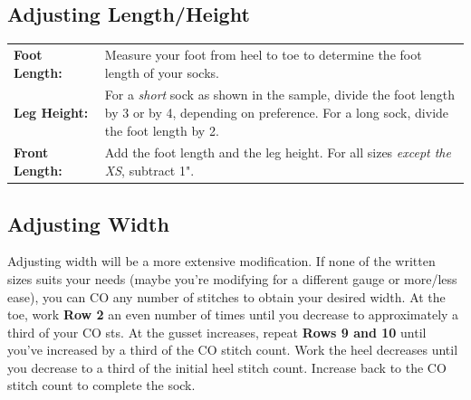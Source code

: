\documentclass[12pt]{article}
\newcommand{\blank}{\underline{\hspace{2em}} } %
\begin{document}
\subsection*{Adjusting Length/Height}

\begin{tabular}{p{0.2\linewidth} p{0.8\linewidth}}
\textbf{Foot Length: \blank} &  Measure your foot from heel to toe to determine the foot length of your socks. \\

\textbf{Leg Height: \blank} & For a \emph{short} sock as shown in the sample, divide the foot length by 3 or by 4, depending on preference. For a long sock, divide the foot length by 2. \\

\textbf{Front Length: \blank} & Add the foot length and the leg height. For all sizes \emph{except the XS}, subtract 1". 
\end{tabular}

\subsection*{Adjusting Width}
Adjusting width will be a more extensive modification. If none of the written sizes suits your needs (maybe you're modifying for a different gauge or more/less ease), you can CO any number of stitches to obtain your desired width. At the toe, work \textbf{Row 2} an even number of times until you decrease to approximately a third of your CO sts. At the gusset increases, repeat \textbf{Rows 9 and 10} until you've increased by a third of the CO stitch count. Work the heel decreases until you decrease to a third of the initial heel stitch count. Increase back to the CO stitch count to complete the sock.
\end{document}
